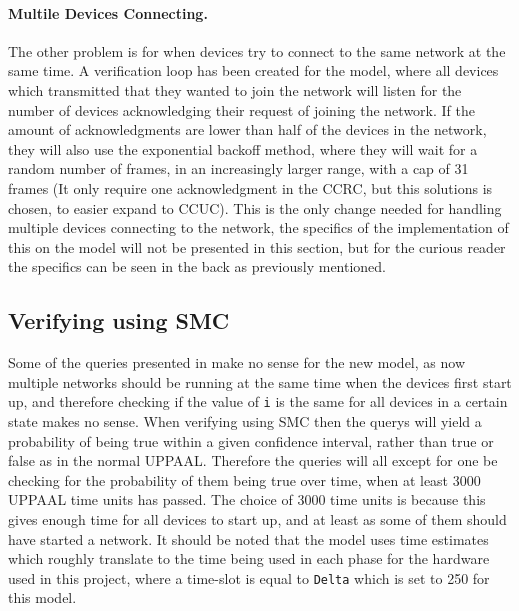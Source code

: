 \paragraph{Multile Devices Connecting.}
The other problem is for when devices try to connect to the same network at the same time.
A verification loop has been created for the model, where all devices which transmitted that they wanted to join the network will listen for the number of devices acknowledging their request of joining the network.
If the amount of acknowledgments are lower than half of the devices in the network, they will also use the exponential backoff method, where they will wait for a random number of frames, in an increasingly larger range, with a cap of 31 frames (It only require one acknowledgment in the CCRC, but this solutions is chosen, to easier expand to CCUC).
This is the only change needed for handling multiple devices connecting to the network, the specifics of the implementation of this on the model will not be presented in this section, but for the curious reader the specifics can be seen in the back as previously mentioned.


\subsection*{Verifying using SMC}

Some of the queries presented in  make no sense for the new model, as now multiple networks should be running at the same time when the devices first start up, and therefore checking if the value of \texttt{i} is the same for all devices in a certain state makes no sense.
When verifying using SMC then the querys will yield a probability of being true within a given confidence interval, rather than true or false as in the normal UPPAAL.
Therefore the queries will all except for one be checking for the probability of them being true over time, when at least 3000 UPPAAL time units has passed.
The choice of 3000 time units is because this gives enough time for all devices to start up, and at least as some of them should have started a network. 
It should be noted that the model uses time estimates which roughly translate to the time being used in each phase for the hardware used in this project, where a time-slot is equal to \texttt{Delta} which is set to 250 for this model.



